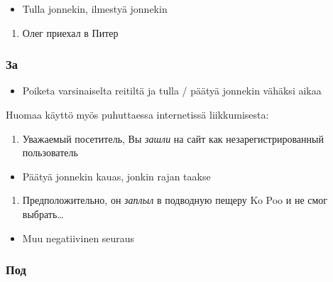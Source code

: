 \documentclass[]{scrartcl}
\providecommand{\tightlist}{%
  \setlength{\itemsep}{0pt}\setlength{\parskip}{0pt}}
\begin{document}
\begin{itemize}
\tightlist
\item
  Tulla jonnekin, ilmestyä jonnekin
\end{itemize}

\begin{enumerate}
\def\labelenumi{(\arabic{enumi})}
\setcounter{enumi}{425}
\tightlist
\item
  Олег приехал в Питер
\end{enumerate}

\subsubsection{За}\label{ux437ux430}

\begin{itemize}
\tightlist
\item
  Poiketa varsinaiselta reitiltä ja tulla / päätyä jonnekin vähäksi
  aikaa
\end{itemize}

Huomaa käyttö myös puhuttaessa internetissä liikkumisesta:

\begin{enumerate}
\def\labelenumi{(\arabic{enumi})}
\setcounter{enumi}{426}
\tightlist
\item
  Уважаемый посетитель, Вы \emph{зашли} на сайт как незарегистрированный
  пользователь
\end{enumerate}

\begin{itemize}
\tightlist
\item
  Päätyä jonnekin kauas, jonkin rajan taakse
\end{itemize}

\begin{enumerate}
\def\labelenumi{(\arabic{enumi})}
\setcounter{enumi}{427}
\tightlist
\item
  Предположительно, он \emph{заплыл} в подводную пещеру Ko Poo и не смог
  выбрать\ldots{}
\end{enumerate}

\begin{itemize}
\tightlist
\item
  Muu negatiivinen seuraus
\end{itemize}

\subsubsection{Под}\label{ux43fux43eux434}
\end{document}

